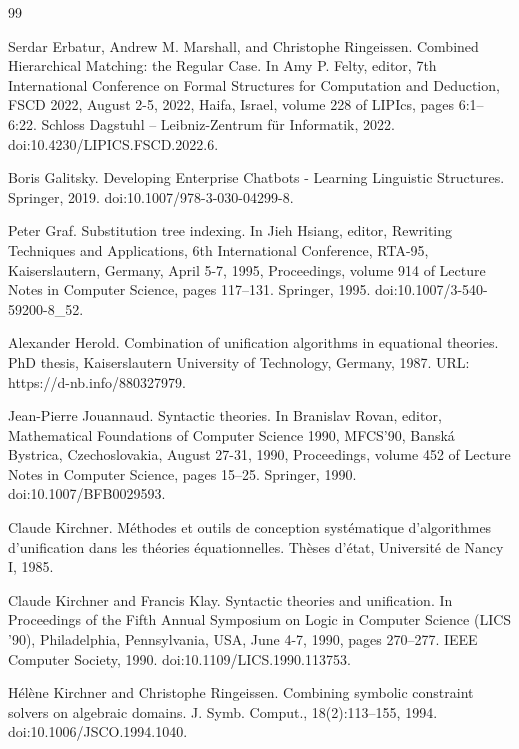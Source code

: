 \documentclass[10pt,a4paper]{amsart}
\begin{document}
\begin{thebibliography}{99}
\par\noindent  [23]  Serdar Erbatur, Andrew M. Marshall, and Christophe Ringeissen.  Combined Hierarchical Matching: the Regular Case.  In Amy P. Felty, editor, 7th International Conference on Formal Structures for Computation and Deduction, FSCD 2022, August 2-5, 2022, Haifa, Israel, volume 228 of LIPIcs, pages 6:1–6:22. Schloss Dagstuhl – Leibniz-Zentrum für Informatik, 2022.  doi:10.4230/LIPICS.FSCD.2022.6.  
 
\par\noindent  [24]  Boris Galitsky.  Developing Enterprise Chatbots - Learning Linguistic Structures.  Springer, 2019.  doi:10.1007/978-3-030-04299-8.  
 
\par\noindent  [25]  Peter Graf.  Substitution tree indexing.  In Jieh Hsiang, editor, Rewriting Techniques and Applications, 6th International Conference, RTA-95, Kaiserslautern, Germany, April 5-7, 1995, Proceedings, volume 914 of Lecture Notes in Computer Science, pages 117–131. Springer, 1995.  doi:10.1007/3-540-59200-8\_52.  
 
\par\noindent  [26]  Alexander Herold.  Combination of unification algorithms in equational theories.  PhD thesis, Kaiserslautern University of Technology, Germany, 1987.  URL: https://d-nb.info/880327979.  
 
\par\noindent  [27]  Jean-Pierre Jouannaud.  Syntactic theories.  In Branislav Rovan, editor, Mathematical Foundations of Computer Science 1990, MFCS’90, Banská Bystrica, Czechoslovakia, August 27-31, 1990, Proceedings, volume 452 of Lecture Notes in Computer Science, pages 15–25. Springer, 1990.  doi:10.1007/BFB0029593.  
 
\par\noindent  [28]  Claude Kirchner.  Méthodes et outils de conception systématique d’algorithmes d’unification dans les théories équationnelles.  Thèses d’état, Université de Nancy I, 1985.  
 
\par\noindent  [29]  Claude Kirchner and Francis Klay.  Syntactic theories and unification.  In Proceedings of the Fifth Annual Symposium on Logic in Computer Science (LICS ’90), Philadelphia, Pennsylvania, USA, June 4-7, 1990, pages 270–277. IEEE Computer Society, 1990.  doi:10.1109/LICS.1990.113753.  
 
\par\noindent  [30]  Hélène Kirchner and Christophe Ringeissen.  Combining symbolic constraint solvers on algebraic domains.  J. Symb. Comput., 18(2):113–155, 1994.  doi:10.1006/JSCO.1994.1040.  
 

\end{thebibliography}
\end{document}
